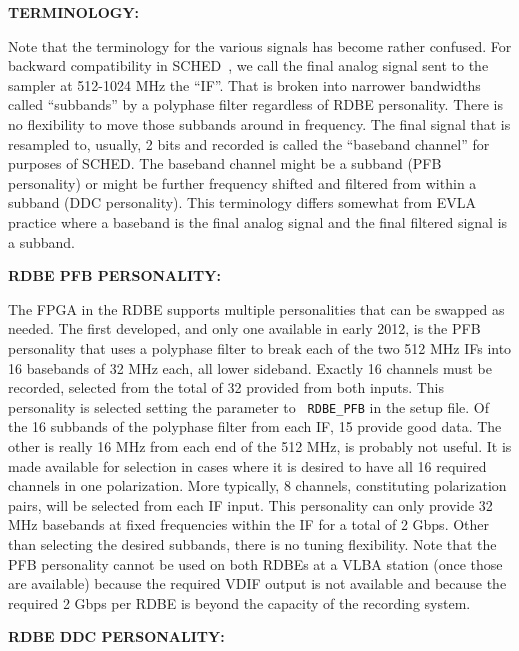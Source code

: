 \documentclass{report}
\newcommand{\sched}{{\sc SCHED}}
\newcommand{\schedb}{{\sc SCHED~}}
\begin{document}
{\bf TERMINOLOGY:}

Note that the terminology for the various signals has become rather
confused.  For backward compatibility in \schedb, we call the final
analog signal sent to the sampler at 512-1024 MHz the ``IF''.  That is
broken into narrower bandwidths called ``subbands'' by a polyphase
filter regardless of RDBE personality.  There is no flexibility to
move those subbands around in frequency.  The final signal that is
resampled to, usually, 2 bits and recorded is called the ``baseband
channel'' for purposes of \sched.  The baseband channel might be a
subband (PFB personality) or might be further frequency shifted and
filtered from within a subband (DDC personality).  This terminology
differs somewhat from EVLA practice where a baseband is the final 
analog signal and the final filtered signal is a subband.

{\bf RDBE PFB PERSONALITY:}

The FPGA in the RDBE supports multiple personalities that can be
swapped as needed.  The first developed, and only one available in
early 2012, is the PFB personality that uses a polyphase filter to
break each of the two 512 MHz IFs into 16 basebands of 32 MHz each,
all lower sideband.  Exactly 16 channels must be recorded, selected
from the total of 32 provided from both inputs.  This personality is
selected setting the  parameter to {\tt
RDBE\_PFB} in the setup file.  Of the 16 subbands of the polyphase
filter from each IF, 15 provide good data.  The other is really 16 MHz
from each end of the 512 MHz, is probably not useful.  It is made
available for selection in cases where it is desired to have all 16
required channels in one polarization.  More typically, 8 channels,
constituting polarization pairs, will be selected from each IF input.
This personality can only provide 32 MHz basebands at fixed
frequencies within the IF for a total of 2 Gbps.  Other than selecting
the desired subbands, there is no tuning flexibility.  Note that
the PFB personality cannot be used on both RDBEs at a VLBA station
(once those are available) because the required VDIF output is not
available and because the required 2 Gbps per RDBE is beyond the
capacity of the recording system.


{\bf RDBE DDC PERSONALITY:}
\end{document}
